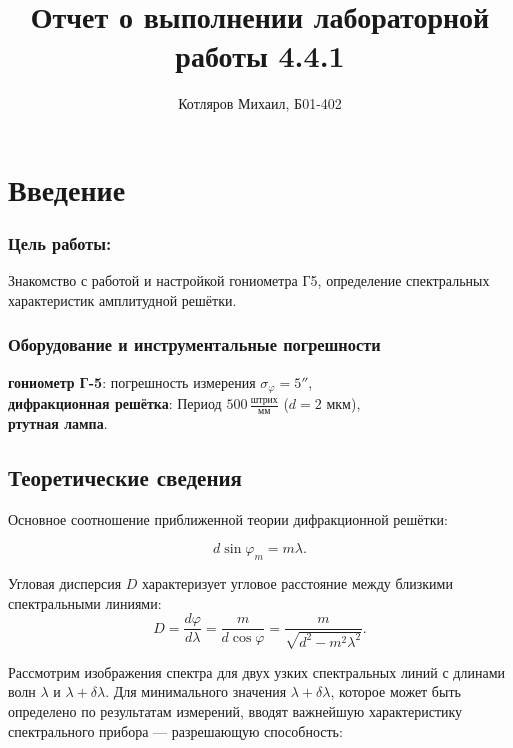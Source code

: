 \documentclass[a4paper]{article}
\title{\textbf{Отчет о выполнении лабораторной работы 4.4.1}}
\date{}
\author{Котляров Михаил, Б01-402}
\begin{document}
\maketitle
	
\section{Введение}

\subsubsection*{Цель работы:} Знакомство с работой и настройкой гониометра Г5, определение спектральных характеристик амплитудной решётки.

\subsubsection*{Оборудование и инструментальные погрешности}

\textbf{гониометр Г-5}: погрешность измерения $\sigma_\varphi = 5''$,\\
\textbf{дифракционная решётка}: Период $500 \, \frac{\text{штрих}}{\text{мм}} $ ($d = 2$ мкм),\\
\textbf{ртутная лампа}.

\subsection*{Теоретические сведения}

Основное соотношение приближенной теории дифракционной решётки:

	\begin{equation}
	d\sin \varphi_m = m\lambda.
 \label{main}
	\end{equation}
 
Угловая дисперсия $D$ характеризует угловое расстояние между близкими спектральными линиями:
	\begin{equation}
	D = \frac{d\varphi}{d\lambda} = \frac{m}{d \cos \varphi}=\frac{m}{\sqrt{d^{2}-m^{2} \lambda^{2}}}.
	\label{Dispersion}
	\end{equation}

Рассмотрим изображения спектра для двух узких спектральных линий с длинами волн $\lambda$ и $\lambda+\delta\lambda$. Для минимального значения $\lambda+\delta\lambda$, которое может быть определено по результатам измерений, вводят важнейшую характеристику спектрального прибора — разрешающую способность:
\end{document}
